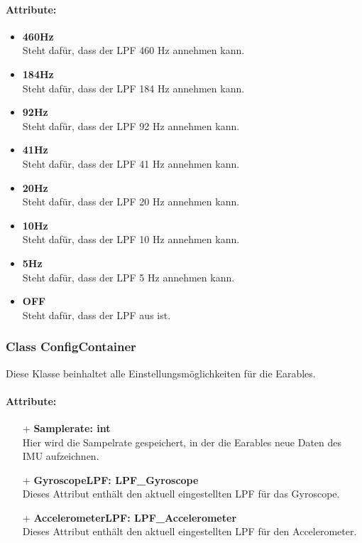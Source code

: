 \documentclass[a4paper,12pt]{article}
\begin{document}
\paragraph{Attribute:}
\begin{itemize}
	\item \textbf{460Hz}\\Steht dafür, dass der LPF 460 Hz annehmen kann.
	\item \textbf{184Hz}\\Steht dafür, dass der LPF 184 Hz annehmen kann.
	\item \textbf{92Hz}\\Steht dafür, dass der LPF 92 Hz annehmen kann.
	\item \textbf{41Hz}\\Steht dafür, dass der LPF 41 Hz annehmen kann.
	\item \textbf{20Hz}\\Steht dafür, dass der LPF 20 Hz annehmen kann.
	\item \textbf{10Hz}\\Steht dafür, dass der LPF 10 Hz annehmen kann.
	\item \textbf{5Hz}\\Steht dafür, dass der LPF 5 Hz annehmen kann.
	\item \textbf{OFF}\\Steht dafür, dass der LPF aus ist.
\end{itemize}


\subsubsection{Class ConfigContainer}
Diese Klasse beinhaltet alle Einstellungsmöglichkeiten für die Earables.

\paragraph{Attribute:}
\begin{itemize}
	\item[+] \textbf{Samplerate: int}\\Hier wird die Sampelrate gespeichert, in der die Earables neue Daten des IMU aufzeichnen.
	\item[+] \textbf{GyroscopeLPF: LPF\_Gyroscope}\\Dieses Attribut enthält den aktuell eingestellten LPF für das Gyroscope.
	\item[+] \textbf{AccelerometerLPF: LPF\_Accelerometer}\\Dieses Attribut enthält den aktuell eingestellten LPF für den Accelerometer.
\end{itemize}
\end{document}

